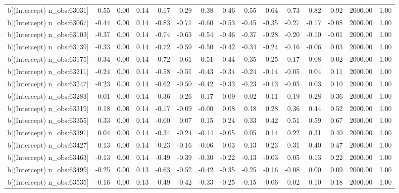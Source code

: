 \begin{table}[ht]
\begin{tabular}{rrrrrrrrrrrrrrr}
  b[(Intercept) n\_obs:63031] & 0.55 & 0.00 & 0.14 & 0.17 & 0.29 & 0.38 & 0.46 & 0.55 & 0.64 & 0.73 & 0.82 & 0.92 & 2000.00 & 1.00 \\ 
  b[(Intercept) n\_obs:63067] & -0.44 & 0.00 & 0.14 & -0.83 & -0.71 & -0.60 & -0.53 & -0.45 & -0.35 & -0.27 & -0.17 & -0.08 & 2000.00 & 1.00 \\ 
  b[(Intercept) n\_obs:63103] & -0.37 & 0.00 & 0.14 & -0.74 & -0.63 & -0.54 & -0.46 & -0.37 & -0.28 & -0.20 & -0.10 & -0.01 & 2000.00 & 1.00 \\ 
  b[(Intercept) n\_obs:63139] & -0.33 & 0.00 & 0.14 & -0.72 & -0.59 & -0.50 & -0.42 & -0.34 & -0.24 & -0.16 & -0.06 & 0.03 & 2000.00 & 1.00 \\ 
  b[(Intercept) n\_obs:63175] & -0.34 & 0.00 & 0.14 & -0.72 & -0.61 & -0.51 & -0.44 & -0.35 & -0.25 & -0.17 & -0.08 & 0.02 & 2000.00 & 1.00 \\ 
  b[(Intercept) n\_obs:63211] & -0.24 & 0.00 & 0.14 & -0.58 & -0.51 & -0.43 & -0.34 & -0.24 & -0.14 & -0.05 & 0.04 & 0.11 & 2000.00 & 1.00 \\ 
  b[(Intercept) n\_obs:63247] & -0.23 & 0.00 & 0.14 & -0.62 & -0.50 & -0.42 & -0.33 & -0.23 & -0.13 & -0.05 & 0.03 & 0.10 & 2000.00 & 1.00 \\ 
  b[(Intercept) n\_obs:63283] & 0.01 & 0.00 & 0.14 & -0.36 & -0.26 & -0.17 & -0.09 & 0.02 & 0.11 & 0.19 & 0.28 & 0.36 & 2000.00 & 1.00 \\ 
  b[(Intercept) n\_obs:63319] & 0.18 & 0.00 & 0.14 & -0.17 & -0.09 & -0.00 & 0.08 & 0.18 & 0.28 & 0.36 & 0.44 & 0.52 & 2000.00 & 1.00 \\ 
  b[(Intercept) n\_obs:63355] & 0.33 & 0.00 & 0.14 & -0.00 & 0.07 & 0.15 & 0.24 & 0.33 & 0.42 & 0.51 & 0.59 & 0.67 & 2000.00 & 1.00 \\ 
  b[(Intercept) n\_obs:63391] & 0.04 & 0.00 & 0.14 & -0.34 & -0.24 & -0.14 & -0.05 & 0.05 & 0.14 & 0.22 & 0.31 & 0.40 & 2000.00 & 1.00 \\ 
  b[(Intercept) n\_obs:63427] & 0.13 & 0.00 & 0.14 & -0.23 & -0.16 & -0.06 & 0.03 & 0.13 & 0.23 & 0.31 & 0.40 & 0.47 & 2000.00 & 1.00 \\ 
  b[(Intercept) n\_obs:63463] & -0.13 & 0.00 & 0.14 & -0.49 & -0.39 & -0.30 & -0.22 & -0.13 & -0.03 & 0.05 & 0.13 & 0.22 & 2000.00 & 1.00 \\ 
  b[(Intercept) n\_obs:63499] & -0.25 & 0.00 & 0.13 & -0.63 & -0.52 & -0.42 & -0.35 & -0.25 & -0.16 & -0.08 & 0.00 & 0.09 & 2000.00 & 1.00 \\ 
  b[(Intercept) n\_obs:63535] & -0.16 & 0.00 & 0.13 & -0.49 & -0.42 & -0.33 & -0.25 & -0.15 & -0.06 & 0.02 & 0.10 & 0.18 & 2000.00 & 1.00 \\ 

\end{tabular}
\end{table}
